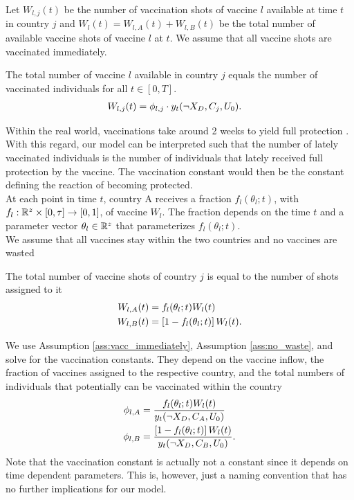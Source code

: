 Let $W_{l,j}(t)$ be the number of vaccination shots of vaccine $l$ available at time $t$ in country $j$ and $W_l(t) = W_{l,A}(t) + W_{l,B}(t)$ be the total number of available vaccine shots of vaccine $l$ at $t$. We assume that all vaccine shots are vaccinated immediately.
\begin{assumption}
\label{ass:vacc_immediately}
The total number of vaccine $l$ available in country $j$ equals the number of vaccinated individuals for all $t \in [0, T]$. 
\begin{align}
\label{eq:vaccine_country}
W_{l,j}(t) &= \phi_{l, j} \cdot y_t(\neg X_D, C_j, U_0)  . 
\end{align}
\end{assumption}
\noindent Within the real world, vaccinations take around 2 weeks to yield full protection \citep{cdc.2021}. With this regard, our model can be interpreted such that the number of lately vaccinated individuals is the number of individuals that lately received full protection by the vaccine. The vaccination constant would then be the constant defining the reaction of becoming protected. \\

At each point in time $t$, country A receives a fraction $f_{l}(\theta_l; t)$, with $f_{l}: \mathbb{R}^{z} \times [0, \tau] \to [0,1]$, of vaccine $W_l$. The fraction depends on the time $t$ and a parameter vector $\theta_l \in \mathbb{R}^{z}$ that parameterizes $f_{l}(\theta_l; t)$.\\

We assume that all vaccines stay within the two countries and no vaccines are wasted
\begin{assumption}
\label{ass:no_waste}
The total number of vaccine shots of country $j$ is equal to the number of shots assigned to it
\begin{align}
\label{eq:vaccine_frac}
W_{l,A}(t) &= f_{l}(\theta_l; t) W_l(t) \\
W_{l,B}(t) &= \left[1 - f_{l}(\theta_l; t)\right] W_l(t) \notag.
\end{align}
\end{assumption}
\noindent We use Assumption \ref{ass:vacc_immediately}, Assumption \ref{ass:no_waste}, and solve for the vaccination constants. They depend on the vaccine inflow, the fraction of vaccines assigned to the respective country, and the total numbers of individuals that potentially can be vaccinated within the country
\begin{align*}
\phi_{l,A} &= \frac{ f_{l}(\theta_l; t) W_{l}(t)}{y_t(\neg X_D, C_A, U_0) } \notag \\
\phi_{l,B} &= \frac{\left[1 - f_{l}(\theta_l; t)\right]  W_{l}(t)}{y_t(\neg X_D, C_B, U_0)}.
\end{align*}
Note that the vaccination constant is actually not a constant since it depends on time dependent parameters. This is, however, just a naming convention that has no further implications for our model.

